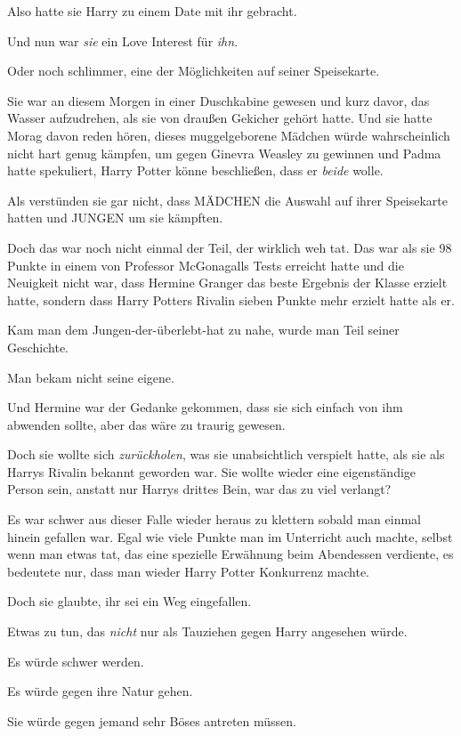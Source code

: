 {Also hatte sie Harry zu einem Date mit ihr gebracht.

Und nun war \emph{sie} ein Love Interest für \emph{ihn}.

Oder noch schlimmer, eine der Möglichkeiten auf seiner Speisekarte.

Sie war an diesem Morgen in einer Duschkabine gewesen und kurz davor, das Wasser aufzudrehen, als sie von draußen Gekicher gehört hatte. Und sie hatte Morag davon reden hören, dieses muggelgeborene Mädchen würde wahrscheinlich nicht hart genug kämpfen, um gegen Ginevra Weasley zu gewinnen und Padma hatte spekuliert, Harry Potter könne beschließen, dass er \emph{beide} wolle.

Als verstünden sie gar nicht, dass MÄDCHEN die Auswahl auf ihrer Speisekarte hatten und JUNGEN um sie kämpften.

Doch das war noch nicht einmal der Teil, der wirklich weh tat. Das war als sie 98 Punkte in einem von Professor McGonagalls Tests erreicht hatte und die Neuigkeit nicht war, dass Hermine Granger das beste Ergebnis der Klasse erzielt hatte, sondern dass Harry Potters Rivalin sieben Punkte mehr erzielt hatte als er.

Kam man dem Jungen-der-überlebt-hat zu nahe, wurde man Teil seiner Geschichte.

Man bekam nicht seine eigene.

Und Hermine war der Gedanke gekommen, dass sie sich einfach von ihm abwenden sollte, aber das wäre zu traurig gewesen.

Doch sie wollte sich \emph{zurückholen}, was sie unabsichtlich verspielt hatte, als sie als Harrys Rivalin bekannt geworden war. Sie wollte wieder eine eigenständige Person sein, anstatt nur Harrys drittes Bein, war das zu viel verlangt?

Es war schwer aus dieser Falle wieder heraus zu klettern sobald man einmal hinein gefallen war. Egal wie viele Punkte man im Unterricht auch machte, selbst wenn man etwas tat, das eine spezielle Erwähnung beim Abendessen verdiente, es bedeutete nur, dass man wieder Harry Potter Konkurrenz machte.

Doch sie glaubte, ihr sei ein Weg eingefallen.

Etwas zu tun, das \emph{nicht} nur als Tauziehen gegen Harry angesehen würde.

Es würde schwer werden.

Es würde gegen ihre Natur gehen.

Sie würde gegen jemand sehr Böses antreten müssen.

}

